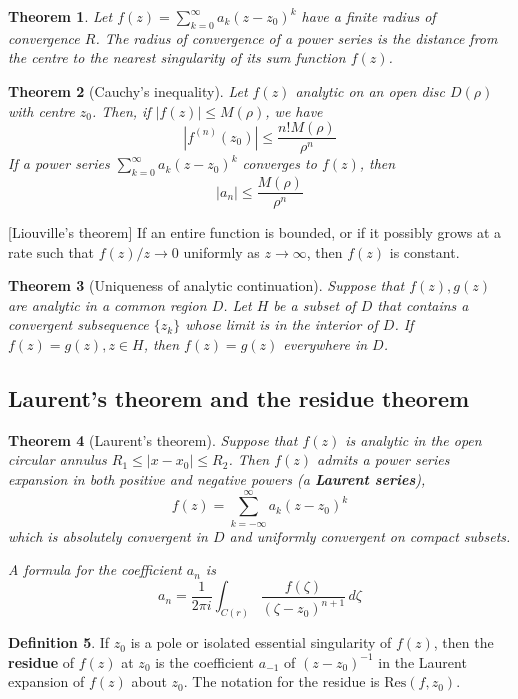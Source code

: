 \documentclass[10pt, oneside, reqno]{amsart}
\theoremstyle{plain}%
\newtheorem{thm}{Theorem}[section]
\theoremstyle{definition}
\newtheorem{defn}[thm]{Definition}
\theoremstyle{remark}
\newcommand{\res}[2]{\text{Res}(#1,#2)}
\begin{document}
\begin{thm}
	Let $f(z) = \sum_{k=0}^\infty a_k (z-z_0)^k$ have a finite radius of convergence $R$.  The radius of convergence of a power series is the distance from the centre to the nearest singularity of its sum function $f(z)$.  
\end{thm}

\begin{thm}[Cauchy's inequality]
	Let $f(z)$ analytic on an open disc $D(\rho)$ with centre $z_0$.  Then, if $|f(z)| \leq M(\rho)$, we have \[
		\left|f^{(n)}(z_0) \right| \leq \frac{n! M(\rho)}{\rho^n}
	\]
	If a power series $\sum_{k=0}^\infty a_k (z-z_0)^k$ converges to $f(z)$, then \[
		|a_n| \leq \frac{M(\rho)}{\rho^n}
	\]
\end{thm}[Liouville's theorem]
If an entire function is bounded, or if it possibly grows at a rate such that $f(z)/z \rightarrow 0$ uniformly as $z \rightarrow \infty$, then $f(z)$ is constant.

\begin{thm}[Uniqueness of analytic continuation]
	Suppose that $f(z), g(z)$ are analytic in a common region $D$.  Let $H$ be a subset of $D$ that contains a convergent subsequence $\{z_k \}$ whose limit is in the interior of $D$.  If $f(z) = g(z), z \in H$, then $f(z) = g(z)$ everywhere in $D$.  
\end{thm}




\subsection{Laurent's theorem and the residue theorem} %
\label{sec:laurent_s_theorem_and_the_residue_theorem}


\begin{thm}[Laurent's theorem]
	Suppose that $f(z)$ is analytic in the open circular annulus $R_1 \leq |x - x_0| \leq R_2$.  Then $f(z)$ admits a power series expansion in both positive and negative powers (a \textbf{Laurent series}), \[
		f(z) = \sum_{k=-\infty}^\infty a_k (z-z_0)^k
	\] which is absolutely convergent in $D$ and uniformly convergent on compact subsets.  
	
	A formula for the coefficient $a_n$ is \[
		a_n = \frac{1}{2\pi i} \int_{C(r)} \frac{f(\zeta)}{(\zeta - z_0)^{n+1}} \, d \zeta
	\]
\end{thm}

\begin{defn}
	If $z_0$ is a pole or isolated essential singularity of $f(z)$, then the \textbf{residue} of $f(z)$ at $z_0$ is the coefficient $a_{-1}$ of $(z-z_0)^{-1}$ in the Laurent expansion of $f(z)$ about $z_0$.  The notation for the residue is $\res{f}{z_0}$.
\end{defn}
\end{document}
